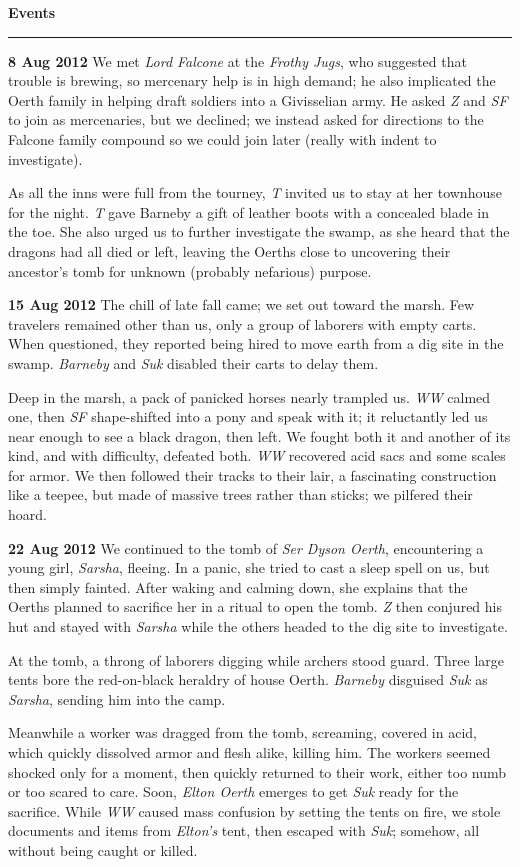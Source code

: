\documentclass[letterpaper]{article}
\newcommand{\e}[1]{\emph{#1}}
\newcommand{\B}[1]{\textbf{#1}}
\newenvironment{notesection}[1]
{ {\huge \B{#1}}\hrule\vspace{0.5em}\begingroup\fontsize{9pt}{12pt}\selectfont}
{\endgroup}
\begin{document}
\begin{notesection}{Events}
\B{8 Aug 2012} We met \e{Lord Falcone} at the \e{Frothy Jugs}, who suggested that trouble is brewing, so mercenary help is in high demand; he also implicated the Oerth family in helping draft soldiers into a Givisselian army.  He asked \e{Z} and \e{SF} to join as mercenaries, but we declined; we instead asked for directions to the Falcone family compound so we could join later (really with indent to investigate).

As all the inns were full from the tourney, \e{T} invited us to stay at her townhouse for the night. \e{T} gave Barneby a gift of leather boots with a concealed blade in the toe. She also urged us to further investigate the swamp, as she heard that the dragons had all died or left, leaving the Oerths close to uncovering their ancestor's tomb for unknown (probably nefarious) purpose.

\B{15 Aug 2012} The chill of late fall came; we set out toward the marsh. Few travelers remained other than us, only a group of laborers with empty carts. When questioned, they reported being hired to move earth from a dig site in the swamp.  \e{Barneby} and \e{Suk} disabled their carts to delay them.

Deep in the marsh, a pack of panicked horses nearly trampled us.  \e{WW} calmed one, then \e{SF} shape-shifted into a pony and speak with it; it reluctantly led us near enough to see a black dragon, then left. We fought both it and another of its kind, and with difficulty, defeated both. \e{WW} recovered acid sacs and some scales for armor. We then followed their tracks to their lair, a fascinating construction like a teepee, but made of massive trees rather than sticks; we pilfered their hoard.

\B{22 Aug 2012} We continued to the tomb of \e{Ser Dyson Oerth}, encountering a young girl, \e{Sarsha}, fleeing. In a panic, she tried to cast a sleep spell on us, but then simply fainted. After waking and calming down, she explains that the Oerths planned to sacrifice her in a ritual to open the tomb. \e{Z} then conjured his hut and stayed with \e{Sarsha} while the others headed to the dig site to investigate.

At the tomb, a throng of laborers digging while archers stood guard. Three large tents bore the red-on-black heraldry of house Oerth. \e{Barneby} disguised \e{Suk} as \e{Sarsha}, sending him into the camp.

Meanwhile a worker was dragged from the tomb, screaming, covered in acid, which quickly dissolved armor and flesh alike, killing him. The workers seemed shocked only for a moment, then quickly returned to their work, either too numb or too scared to care. Soon, \e{Elton Oerth} emerges to get \e{Suk} ready for the sacrifice. While \e{WW} caused mass confusion by setting the tents on fire, we stole documents and items from \e{Elton's} tent, then escaped with \e{Suk}; somehow, all without being caught or killed.


\end{notesection}
\end{document}
